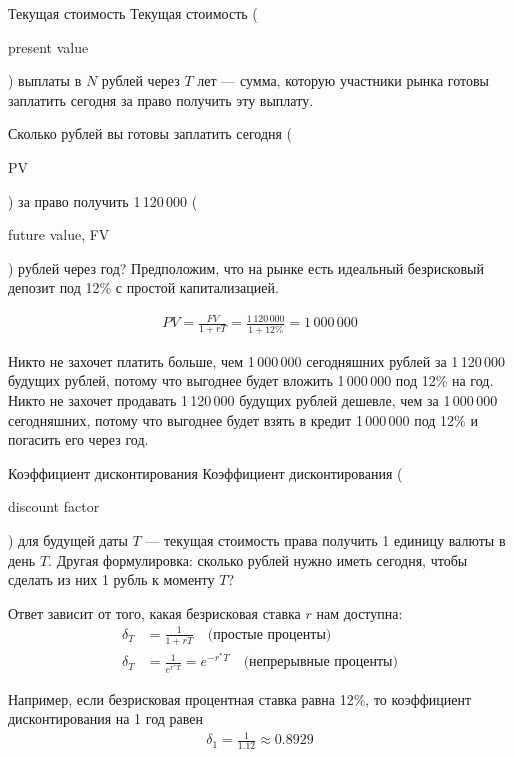 \documentclass{beamer}
\newcommand{\en}[1]{\begin{otherlanguage}{english}#1\end{otherlanguage}}
\begin{document}
\begin{frame}{Текущая стоимость}
\justify
\alert{Текущая стоимость} (\en{present value}) выплаты в $N$ рублей через $T$ лет --- сумма, 
которую участники рынка готовы заплатить сегодня за право получить эту выплату.

\justify
Сколько рублей вы готовы заплатить сегодня (\en{PV}) за право получить 1\,120\,000 (\en{future value, FV}) рублей через год? Предположим, что на рынке есть идеальный безрисковый депозит под 12\% с простой капитализацией.

\begin{align*}
PV = \frac{FV}{1+rT} = \frac{1\,120\,000}{1 + 12\%} = 1\,000\,000
\end{align*}

\justify
Никто не захочет платить больше, чем 1\,000\,000 сегодняшних рублей за 1\,120\,000 будущих рублей, потому что выгоднее будет вложить 1\,000\,000 под 12\% на год. Никто не захочет продавать 1\,120\,000 будущих рублей дешевле, чем за 1\,000\,000 сегодняшних, потому что выгоднее будет взять в кредит 1\,000\,000 под 12\% и погасить его через год.
\end{frame}



\begin{frame}{Коэффициент дисконтирования}
\justify
\alert{Коэффициент дисконтирования} (\en{discount factor}) для будущей даты $T$ --- текущая стоимость права получить 1 единицу валюты в день $T$. Другая формулировка: сколько рублей нужно иметь сегодня, чтобы сделать из них 1 рубль к моменту $T$?

\justify
Ответ зависит от того, какая безрисковая ставка $r$ нам доступна:
\begin{align*}
\delta_T &= \frac{1}{1 + rT} \quad \text{(простые проценты)} \\
\delta_T &= \frac{1}{e^{r^*T}} = e^{-r^*T} \quad \text{(непрерывные проценты)}
\end{align*}

\justify
Например, если безрисковая процентная ставка равна 12\%, то коэффициент дисконтирования на 1 год равен
\begin{align*}
\delta_1 = \frac{1}{1.12} \approx 0.8929
\end{align*}
\end{frame}
\end{document}
